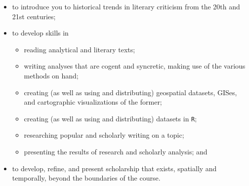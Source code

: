 \begin{itemize}

	\item to introduce you to historical trends in literary criticism from the 20th and 21st centuries; 

  \item to develop skills in 

    \begin{itemize}

			\item reading analytical and literary texts;

			\item writing analyses that are cogent and syncretic, making use of the
various methods on hand;

			\item creating (as well as using and distributing) geospatial datasets,
GISes, and cartographic visualizations of the former; 

      \item creating (as well as using and distributing) datasets in \texttt{R};
        
      \item researching popular and scholarly writing on a topic;
        
      \item presenting the results of research and scholarly analysis; and

    \end{itemize}

	\item to develop, refine, and present scholarship that exists, spatially and
temporally, beyond the boundaries of the course.

\end{itemize}
